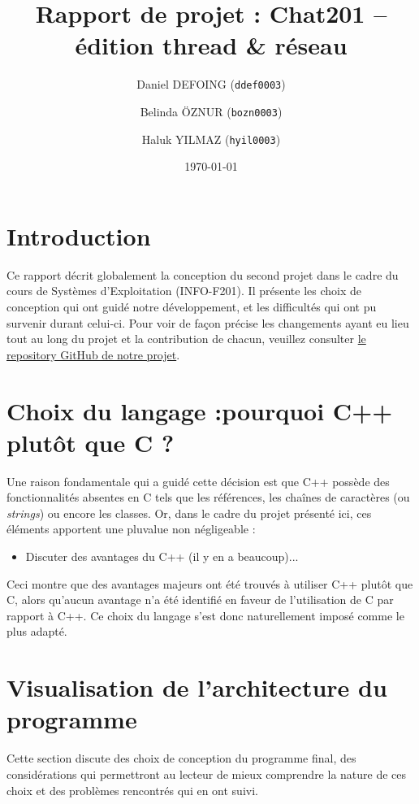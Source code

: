 \documentclass{article}
\title{Rapport de projet : Chat201 – édition thread \& réseau}
\author{Daniel DEFOING (\texttt{ddef0003}) \and 
        Belinda ÖZNUR (\texttt{bozn0003}) \and
        Haluk YILMAZ (\texttt{hyil0003})}
\date{\today}
\begin{document}

\maketitle
\tableofcontents
\newpage

\section{Introduction}
Ce rapport décrit globalement la conception du second projet dans le cadre du cours de Systèmes d’Exploitation
(INFO-F201). Il présente les choix de conception qui ont guidé notre développement, et les difficultés qui ont pu survenir durant celui-ci. Pour voir de façon précise les changements ayant eu lieu tout au long du projet et la contribution de chacun, veuillez consulter \hyperref[https://github.com/Daniel-Dfg/OS_Projet_2]{le repository GitHub de notre projet}.

\section{Choix du langage :pourquoi C++ plutôt que C ?}

Une raison fondamentale qui a guidé cette décision est que C++ possède des fonctionnalités absentes
en C tels que les références, les chaînes de caractères (ou \textit{strings}) ou encore les classes. Or, dans le cadre du projet présenté ici, ces éléments apportent une pluvalue non négligeable :
\begin{itemize}
    \item Discuter des avantages du C++ (il y en a beaucoup)...
\end{itemize}
Ceci montre que des avantages majeurs ont été trouvés à utiliser C++ plutôt que C, alors qu’aucun avantage n’a été identifié en faveur de l’utilisation de C par rapport à C++. Ce choix du langage s’est donc naturellement imposé comme le plus adapté.

\section{Visualisation de l'architecture du programme}
Cette section discute des choix de conception du programme final, des considérations qui permettront au lecteur de mieux comprendre la nature de ces choix et des problèmes rencontrés qui en ont suivi.
\end{document}
